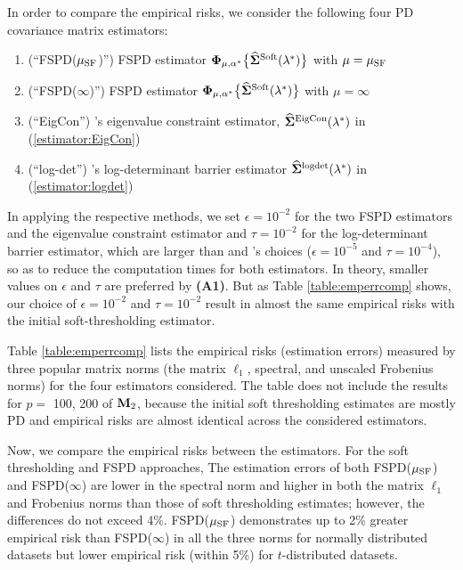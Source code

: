 \documentclass[times,sort&compress,3p]{elsarticle}
\newcommand{\BNUM}{\begin{enumerate}}
\newcommand{\ENUM}{\end{enumerate}}
\begin{document}
In order to compare the empirical risks, we consider the following four PD covariance matrix estimators:
\BNUM
\item (``FSPD($\mu_{\rm SF}$)'') FSPD estimator ${\bf \Phi}_{\mu, \alpha^*}\big\{
	\widehat{\bf \Sigma}^{\rm Soft}(\lambda^*)\big\}$ with $\mu = \mu_{\rm SF}$
\item (``FSPD($\infty$)'') FSPD estimator ${\bf \Phi}_{\mu, \alpha^*}\big\{
	\widehat{\bf \Sigma}^{\rm Soft}(\lambda^*)\big\}$ with $\mu = \infty$
\item (``EigCon'') \citet{Xue2012}'s eigenvalue constraint estimator,
	$\widehat{\bf \Sigma}^{\rm EigCon}(\lambda^*)$ in (\ref{estimator:EigCon})
\item (``log-det'') \citet{Rothman2012}'s log-determinant barrier estimator
	$\widehat{\bf \Sigma}^{\rm logdet}(\lambda^*)$ in (\ref{estimator:logdet})
\ENUM
In applying the respective methods, we set $\epsilon = 10^{-2}$ for the two FSPD estimators and the eigenvalue constraint estimator and $\tau = 10^{-2}$ for the log-determinant barrier estimator, which are larger than \citet{Rothman2012} and \citet{Xue2012}'s choices ($\epsilon = 10^{-5}$ 
and $\tau = 10^{-4}$), so as to reduce the computation times for both estimators. In theory, smaller values on 
$\epsilon$ and $\tau$ are preferred by {\bf (A1)}. But as Table \ref{table:emperrcomp} shows, our choice of 
$\epsilon = 10^{-2}$ and $\tau = 10^{-2}$ result in almost the same empirical risks with the initial soft-thresholding estimator.



Table \ref{table:emperrcomp} lists the empirical risks (estimation errors) measured by three popular matrix norms (the matrix $\ell_1$, spectral,
and unscaled Frobenius norms)
for the four estimators considered. The table does not include the results for $p=$ 100, 200 of ${\bf M}_2$, because the initial soft thresholding estimates are mostly PD and empirical risks  
are almost identical across the considered estimators.


Now, we compare the empirical risks between the estimators. For the soft thresholding and FSPD approaches,
The estimation errors of both FSPD($\mu_{\rm SF}$) and FSPD($\infty$) 
are lower in the spectral norm and higher in both the matrix $\ell_1$ and Frobenius norms than those of soft thresholding estimates;  however, the differences do not exceed 4\%.
FSPD($\mu_{\rm SF}$) demonstrates up to 2\% greater empirical
risk than FSPD($\infty$) in all the three norms for normally distributed datasets but lower empirical risk
 (within 5\%) for $t$-distributed datasets.
\end{document}
